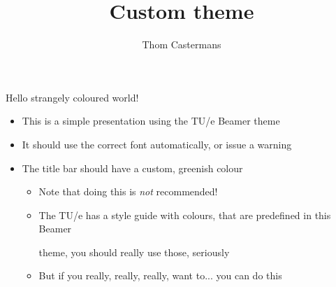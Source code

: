 \documentclass[12pt, aspectratio=169]{beamer} %
\title{Custom theme}
\author{Thom Castermans}
\begin{document}
\begin{titleframe}
\end{titleframe}

\begin{frame}{Hello strangely coloured world!}
  \begin{itemize}
    \item This is a simple presentation using the TU/e Beamer theme
    \item It should use the correct font automatically, or issue a warning
    \item The title bar should have a custom, greenish colour
    \begin{itemize}
      \item Note that doing this is \emph{not} recommended!
      \item The TU/e has a style guide with colours, that are predefined in this Beamer

      theme, you should really use those, \alert{seriously}
      \item But if you really, really, really, want to... you can do this
    \end{itemize}
  \end{itemize}
\end{frame}
\end{document}
